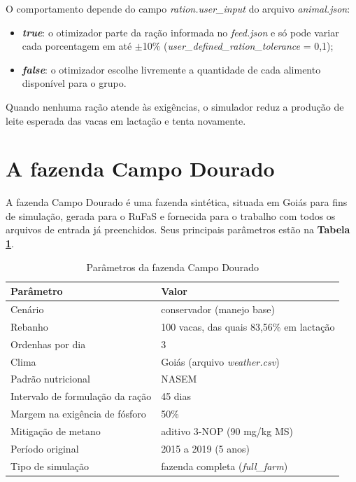 \documentclass[a4paper,12pt]{article}
\begin{document}
O comportamento depende do campo \textit{ration.user\_input} do arquivo \textit{animal.json}:

\begin{itemize}
    \item \textbf{\textit{true}}: o otimizador parte da ração informada no \textit{feed.json} e só pode variar cada porcentagem em até $\pm$10\% (\textit{user\_defined\_ration\_tolerance} = 0,1);
    \item \textbf{\textit{false}}: o otimizador escolhe livremente a quantidade de cada alimento disponível para o grupo.
\end{itemize}

Quando nenhuma ração atende às exigências, o simulador reduz a produção de leite esperada das vacas em lactação e tenta novamente.

\section{A fazenda Campo Dourado}\label{sec:fazenda}

A fazenda Campo Dourado é uma fazenda sintética, situada em Goiás para fins de simulação, gerada para o RuFaS e fornecida para o trabalho com todos os arquivos de entrada já preenchidos. Seus principais parâmetros estão na \textbf{Tabela \ref{tab:fazenda}}.

\begin{table}[htbp]
    \centering
    \caption{Parâmetros da fazenda Campo Dourado}
    \label{tab:fazenda}
    \begin{tabular}{ll}
        \toprule
        \textbf{Parâmetro} & \textbf{Valor} \\
        \midrule
        \rowcolor{gray!15}
        Cenário & conservador (manejo base) \\
        Rebanho & 100 vacas, das quais 83,56\% em lactação \\
        \rowcolor{gray!15}
        Ordenhas por dia & 3 \\
        Clima & Goiás (arquivo \textit{weather.csv}) \\
        \rowcolor{gray!15}
        Padrão nutricional & NASEM \\
        Intervalo de formulação da ração & 45 dias \\
        \rowcolor{gray!15}
        Margem na exigência de fósforo & 50\% \\
        Mitigação de metano & aditivo 3-NOP (90 mg/kg MS) \\
        \rowcolor{gray!15}
        Período original & 2015 a 2019 (5 anos) \\
        Tipo de simulação & fazenda completa (\textit{full\_farm}) \\
        \bottomrule
    \end{tabular}
\end{table}
\end{document}
